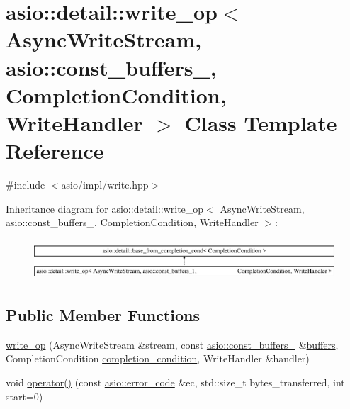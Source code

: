 \hypertarget{classasio_1_1detail_1_1write__op_3_01_async_write_stream_00_01asio_1_1const__buffers__1_00_01_014e1524567dd7f87180ace12b51858864}{}\section{asio\+:\+:detail\+:\+:write\+\_\+op$<$ Async\+Write\+Stream, asio\+:\+:const\+\_\+buffers\+\_, Completion\+Condition, Write\+Handler $>$ Class Template Reference}
\label{classasio_1_1detail_1_1write__op_3_01_async_write_stream_00_01asio_1_1const__buffers__1_00_01_014e1524567dd7f87180ace12b51858864}


{\ttfamily \#include $<$asio/impl/write.\+hpp$>$}

Inheritance diagram for asio\+:\+:detail\+:\+:write\+\_\+op$<$ Async\+Write\+Stream, asio\+:\+:const\+\_\+buffers\+\_, Completion\+Condition, Write\+Handler $>$\+:\begin{figure}[H]
\begin{center}
\leavevmode
\includegraphics[height=1.540578cm]{classasio_1_1detail_1_1write__op_3_01_async_write_stream_00_01asio_1_1const__buffers__1_00_01_014e1524567dd7f87180ace12b51858864}
\end{center}
\end{figure}
\subsection*{Public Member Functions}
\begin{DoxyCompactItemize}
\item 
\hyperlink{classasio_1_1detail_1_1write__op_3_01_async_write_stream_00_01asio_1_1const__buffers__1_00_01_014e1524567dd7f87180ace12b51858864_a35021104e8bd47e183197db2e3407b46}{write\+\_\+op} (Async\+Write\+Stream \&stream, const \hyperlink{classasio_1_1const__buffers__1}{asio\+::const\+\_\+buffers\+\_} \&\hyperlink{group__async__read_ga54dede45c3175148a77fe6635222c47d}{buffers}, Completion\+Condition \hyperlink{group__async__read_gae2e215d5013596cc2b385bb6c13fa518}{completion\+\_\+condition}, Write\+Handler \&handler)
\item 
void \hyperlink{classasio_1_1detail_1_1write__op_3_01_async_write_stream_00_01asio_1_1const__buffers__1_00_01_014e1524567dd7f87180ace12b51858864_a7c278fcc1f3bde4633cebfb6c3ca70ea}{operator()} (const \hyperlink{classasio_1_1error__code}{asio\+::error\+\_\+code} \&ec, std\+::size\+\_\+t bytes\+\_\+transferred, int start=0)
\end{DoxyCompactItemize}
